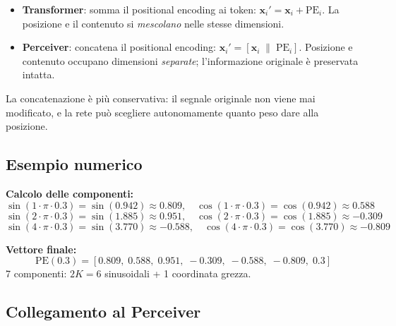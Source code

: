 \documentclass[
  11pt,
]{article}
\begin{document}
\begin{notabox}[title={\textbf{Perceiver (concatenazione) vs Transformer (somma)}}]
\begin{itemize}
  \item \textbf{Transformer}: somma il positional encoding ai token: $\mathbf{x}_i' = \mathbf{x}_i + \text{PE}_i$. La posizione e il contenuto si \emph{mescolano} nelle stesse dimensioni.
  \item \textbf{Perceiver}: concatena il positional encoding: $\mathbf{x}_i' = [\mathbf{x}_i \;\|\; \text{PE}_i]$. Posizione e contenuto occupano dimensioni \emph{separate}; l'informazione originale è preservata intatta.
\end{itemize}
La concatenazione è più conservativa: il segnale originale non viene mai modificato, e la rete può scegliere autonomamente quanto peso dare alla posizione.
\end{notabox}

\subsection{Esempio numerico}

\begin{notabox}[title={\textbf{Esempio: $x = 0.3$, $K = 3$ bande, frequenze $f_1=1, f_2=2, f_3=4$}}]
\textbf{Calcolo delle componenti:}
\[
\sin(1 \cdot \pi \cdot 0.3) = \sin(0.942) \approx 0.809, \quad \cos(1 \cdot \pi \cdot 0.3) = \cos(0.942) \approx 0.588
\]
\[
\sin(2 \cdot \pi \cdot 0.3) = \sin(1.885) \approx 0.951, \quad \cos(2 \cdot \pi \cdot 0.3) = \cos(1.885) \approx -0.309
\]
\[
\sin(4 \cdot \pi \cdot 0.3) = \sin(3.770) \approx -0.588, \quad \cos(4 \cdot \pi \cdot 0.3) = \cos(3.770) \approx -0.809
\]

\textbf{Vettore finale:}
\[
\text{PE}(0.3) = [0.809,\;0.588,\;0.951,\;-0.309,\;-0.588,\;-0.809,\;0.3]
\]
7 componenti: $2K = 6$ sinusoidali + 1 coordinata grezza.
\end{notabox}

\subsection{Collegamento al Perceiver}
\end{document}
